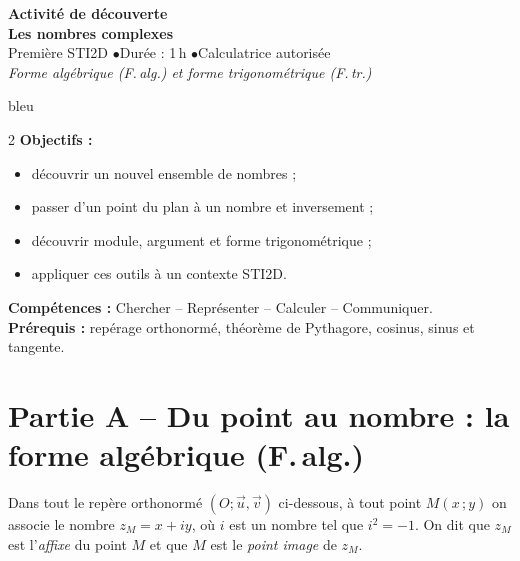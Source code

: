 \documentclass[11pt,a4paper]{article}
\begin{document}
\begin{center}
{\Large\textbf{Activité de découverte}}\\[3pt]
{\LARGE\textbf{Les nombres complexes}}\\[5pt]
{\large Première STI2D \quad$\bullet$\quad Durée : 1\,h \quad$\bullet$\quad Calculatrice autorisée}\\[3pt]
{\normalsize\itshape Forme algébrique (F.\,alg.) \quad et \quad forme trigonométrique (F.\,tr.)}
\end{center}

\begin{encadre}{bleu}
\begin{multicols}{2}
\textbf{Objectifs :}
\begin{itemize}[leftmargin=1.2em,itemsep=1pt,topsep=1pt]
  \item découvrir un nouvel ensemble de nombres ;
  \item passer d'un point du plan à un nombre et inversement ;
  \item découvrir module, argument et forme trigonométrique ;
  \item appliquer ces outils à un contexte STI2D.
\end{itemize}
\columnbreak

\textbf{Compétences :} Chercher -- Représenter -- Calculer -- Communiquer.\\[4pt]
\textbf{Prérequis :} repérage orthonormé, théorème de Pythagore, cosinus, sinus et tangente.
\end{multicols}
\end{encadre}

\section*{Partie A -- Du point au nombre : la forme algébrique (F.\,alg.)}

Dans tout le repère orthonormé $(O;\vec{u},\vec{v})$ ci-dessous, à tout point $M(x\,;y)$
on associe le nombre $z_M = x + iy$, où $i$ est un nombre tel que $i^2 = -1$.
On dit que $z_M$ est l'\emph{affixe} du point $M$ et que $M$ est le \emph{point image} de $z_M$.
\end{document}
